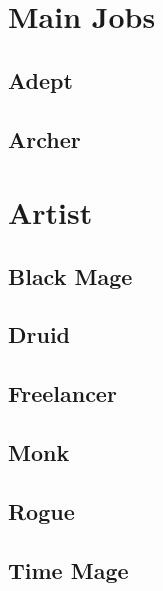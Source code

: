 \section{Main Jobs}\label{sec:jobs-pjob}

\subsection{Adept}


\subsection{Archer}\label{subsec:pjob-archer}


\section{Artist}\label{subsec:pjob-artist}


\subsection{Black Mage}\label{subsec:pjob-blackmage}


\subsection{Druid}\label{subsec:pjob-druid}


\subsection{Freelancer}\label{subsec:pjob-freelancer}


\subsection{Monk}\label{subsec:pjob-monk}


\subsection{Rogue}\label{subsec:pjob-rogue}


\subsection{Time Mage}\label{subsec:pjob-timemage}


